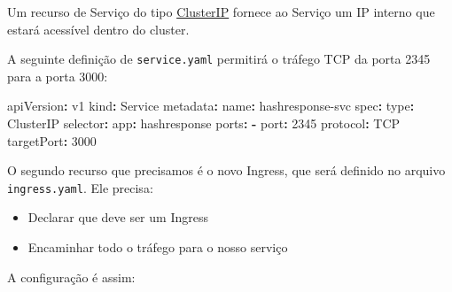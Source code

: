 \documentclass[
]{article}
\newenvironment{Shaded}{}{}
\newcommand{\AttributeTok}[1]{\textcolor[rgb]{0.49,0.56,0.16}{#1}}
\newcommand{\DecValTok}[1]{\textcolor[rgb]{0.25,0.63,0.44}{#1}}
\newcommand{\ExtensionTok}[1]{#1}
\newcommand{\FunctionTok}[1]{\textcolor[rgb]{0.02,0.16,0.49}{#1}}
\newcommand{\KeywordTok}[1]{\textcolor[rgb]{0.00,0.44,0.13}{\textbf{#1}}}
\newcommand{\NormalTok}[1]{#1}
\newcommand{\StringTok}[1]{\textcolor[rgb]{0.25,0.44,0.63}{#1}}
\providecommand{\tightlist}{%
  \setlength{\itemsep}{0pt}\setlength{\parskip}{0pt}}
\begin{document}
\begin{Shaded}
\end{Shaded}

Um recurso de Serviço do tipo
\href{https://kubernetes.io/docs/concepts/services-networking/service/\#type-clusterip}{ClusterIP}
fornece ao Serviço um IP interno que estará acessível dentro do cluster.

A seguinte definição de \texttt{service.yaml} permitirá o tráfego TCP da
porta 2345 para a porta 3000:

\begin{Shaded}
\begin{Highlighting}[]
\FunctionTok{apiVersion}\KeywordTok{:}\AttributeTok{ v1}
\FunctionTok{kind}\KeywordTok{:}\AttributeTok{ Service}
\FunctionTok{metadata}\KeywordTok{:}
\AttributeTok{  }\FunctionTok{name}\KeywordTok{:}\AttributeTok{ hashresponse{-}svc}
\FunctionTok{spec}\KeywordTok{:}
\AttributeTok{  }\FunctionTok{type}\KeywordTok{:}\AttributeTok{ ClusterIP}
\AttributeTok{  }\FunctionTok{selector}\KeywordTok{:}
\AttributeTok{    }\FunctionTok{app}\KeywordTok{:}\AttributeTok{ hashresponse}
\AttributeTok{  }\FunctionTok{ports}\KeywordTok{:}
\AttributeTok{    }\KeywordTok{{-}}\AttributeTok{ }\FunctionTok{port}\KeywordTok{:}\AttributeTok{ }\DecValTok{2345}
\AttributeTok{      }\FunctionTok{protocol}\KeywordTok{:}\AttributeTok{ TCP}
\AttributeTok{      }\FunctionTok{targetPort}\KeywordTok{:}\AttributeTok{ }\DecValTok{3000}
\end{Highlighting}
\end{Shaded}

O segundo recurso que precisamos é o novo Ingress, que será definido no
arquivo \texttt{ingress.yaml}. Ele precisa:

\begin{itemize}
\tightlist
\item
  Declarar que deve ser um Ingress
\item
  Encaminhar todo o tráfego para o nosso serviço
\end{itemize}

A configuração é assim:
\end{document}
